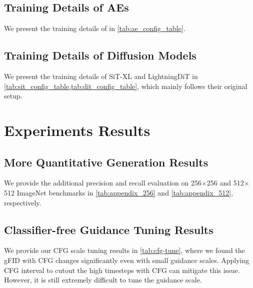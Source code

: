 \subsection{Training Details of AEs}
\label{sec:appendix-exp-ae}

We present the training details of \method in \cref{tab:ae_config_table}.




\subsection{Training Details of Diffusion Models}
\label{sec:appendix-exp-diffusion}

We present the training details of SiT-XL and LightningDiT in \cref{tab:sit_config_table,tab:dit_config_table}, which mainly follows their original setup.






\section{Experiments Results}
\label{sec:appendix-results}


\subsection{More Quantitative Generation Results}
\label{sec:appendix-results-gen}


We provide the additional precision and recall evaluation on 256$\times$256 and 512$\times$512 ImageNet benchmarks in \cref{tab:appendix_256} and \cref{tab:appendix_512}, respectively.





\subsection{Classifier-free Guidance Tuning Results}
\label{sec:appendix-results-cfg}



We provide our CFG scale tuning results in \cref{tab:cfg-tune}, where we found the gFID with CFG changes significantly even with small guidance scales. 
Applying CFG interval \cite{kynkaanniemi2024applying} to cutout the high timesteps with CFG can mitigate this issue. 
However, it is still extremely difficult to tune the guidance scale.

